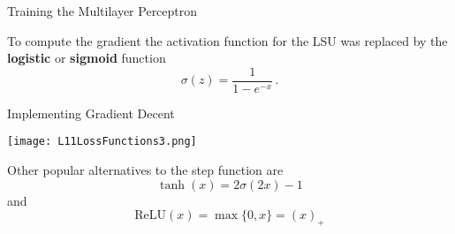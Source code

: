 \documentclass[10pt, table, dvipsnames,xcdraw, handout]{beamer}
\begin{document}
\begin{frame}[fragile]{Training the Multilayer Perceptron}
\begin{minipage}[t][0.5\textheight][t]{\textwidth}
To compute the gradient the activation function for the LSU was replaced by the \textbf{logistic} or \textbf{sigmoid} function 
$$
\sigma(z) = \frac{1}{1-e^{-x}}\,.
$$
\end{minipage}
\end{frame}




\begin{frame}[fragile]{Implementing Gradient Decent}
  \begin{minipage}[t][0.5\textheight][t]{\textwidth}
	\centering \texttt{[image: L11LossFunctions3.png]} 
  \end{minipage}
  \vfill
\begin{minipage}[t][0.5\textheight][t]{\textwidth}

Other popular alternatives to the step function are 
$$
\tanh(x) = 2\sigma(2x) - 1
$$
and 
$$
\text{ReLU}(x) = \max\{0,x\} = (x)_+
$$
\end{minipage}
\end{frame}
\end{document}
